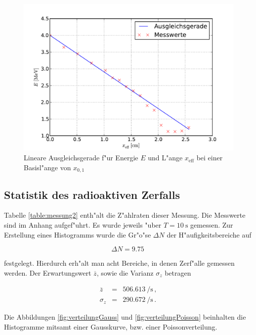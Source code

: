 		\begin{figure}[h]
			\centering
			\includegraphics[width = 13cm]{img/energie2.pdf}
			\caption{Lineare Ausgleichsgerade f"ur Energie $E$ und L"ange $x_\mathrm{eff}$ bei einer Basisl"ange von $x_{0,1}$ \label{fig:energie2}}
		\end{figure}

		\clearpage

	\subsection{Statistik des radioaktiven Zerfalls}
	\label{subsec:statistik}
		Tabelle \ref{table:messung2} enth"alt die Z"ahlraten dieser Messung.
		Die Messwerte sind im Anhang aufgef"uhrt.
		Es wurde jeweils "uber $T = \SI{10}{\second}$ gemessen.
		Zur Erstellung eines Histogramms wurde die Gr"o"se $\Delta N$ der H"aufigkeitsbereiche auf

		\begin{equation*}
			\Delta N = \SI{9.75}{}
		\end{equation*}

		festgelegt.
		Hierdurch erh"alt man acht Bereiche, in denen Zerf"alle gemessen werden.
		Der Erwartungswert $\overline{z}$, sowie die Varianz $\sigma_z$ betragen

		\begin{eqnarray*}
			\overline{z} & = & \SI{506.613}{\per \second} \,, \\
			\sigma_z & = & \SI{290.672}{\per \second} \,.
		\end{eqnarray*}

		Die Abbildungen \ref{fig:verteilungGauss} und \ref{fig:verteilungPoisson} beinhalten die Histogramme mitsamt einer Gausskurve, bzw. einer Poissonverteilung.


